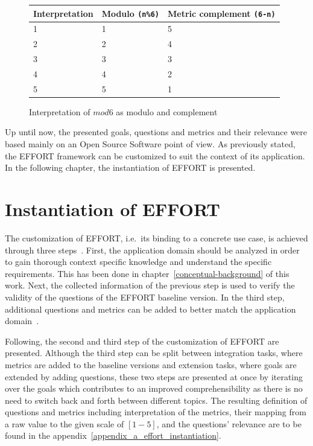 \begin{figure}
\begin{longtable}[]{@{}lll@{}}
\toprule
Interpretation & Modulo \texttt{(n\%6)} & Metric complement \texttt{(6-n)} \\
\midrule
\endhead
1 & 1 & 5 \\
2 & 2 & 4 \\
3 & 3 & 3 \\
4 & 4 & 2 \\
5 & 5 & 1 \\
\bottomrule
\end{longtable}
\caption{Interpretation of $mod6$ as modulo and complement}
\label{table_comparing_modulo}
\end{figure}

Up until now, the presented goals, questions and metrics and their
relevance were based mainly on an Open Source Software point of view. As
previously stated, the EFFORT framework can be customized to suit the
context of its application. In the following chapter, the instantiation
of EFFORT is presented.

\clearpage
\hypertarget{instantiation-of-effort}{%
    \section{Instantiation of EFFORT}\label{instantiation-of-effort}}

The customization of EFFORT, i.e.~its binding to a concrete use case, is
achieved through three steps~\cite{effort}. First, the application domain
should be analyzed in order to gain thorough context specific knowledge
and understand the specific requirements. This has been done in chapter~\ref{conceptual-background}
of this work. Next, the collected information of the previous step
is used to verify the validity of the questions of the EFFORT baseline
version. In the third step, additional questions and metrics can be
added to better match the application domain~\cite{effort}.

Following, the second and third step of the customization of EFFORT are
presented. Although the third step can be split between integration
tasks, where metrics are added to the baseline versions and extension
tasks, where goals are extended by adding questions, these two steps are
presented at once by iterating over the goals which contributes to an
improved comprehensibility as there is no need to switch back and forth
between different topics. The resulting definition of questions and
metrics including interpretation of the metrics, their mapping from a raw
value to the given scale of \([1-5]\), and the questions' relevance
are to be found in the appendix~\ref{appendix_a_effort_instantiation}.


